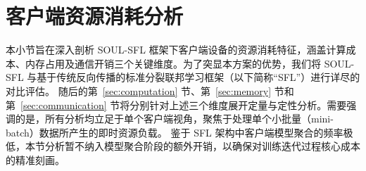 



\section{客户端资源消耗分析}

本小节旨在深入剖析 SOUL-SFL 框架下客户端设备的资源消耗特征，涵盖计算成本、内存占用及通信开销三个关键维度。为了突显本方案的优势，我们将 SOUL-SFL 与基于传统反向传播的标准分裂联邦学习框架（以下简称``SFL''）进行详尽的对比评估。
随后的第~\ref{sec:computation} 节、第~\ref{sec:memory} 节和第~\ref{sec:communication} 节将分别针对上述三个维度展开定量与定性分析。需要强调的是，所有分析均立足于单个客户端视角，聚焦于处理单个小批量（mini-batch）数据所产生的即时资源负载。
鉴于 SFL 架构中客户端模型聚合的频率极低，本节分析暂不纳入模型聚合阶段的额外开销，以确保对训练迭代过程核心成本的精准刻画。


